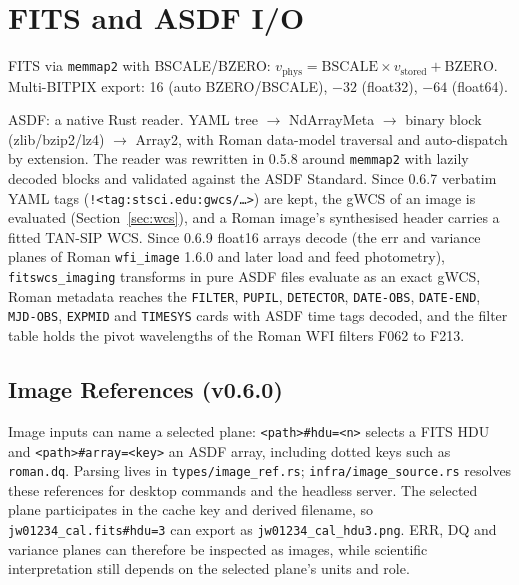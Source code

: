 \documentclass[11pt,a4paper]{article}
\newcommand{\code}[1]{\texttt{\small #1}}
\newcommand{\crate}[1]{\texttt{#1}}
\begin{document}
    \section{FITS and ASDF I/O}
    \label{sec:fitsio}

    FITS via \crate{memmap2} with BSCALE/BZERO: $v_{\text{phys}} = \text{BSCALE} \times v_{\text{stored}} + \text{BZERO}$. Multi-BITPIX export: 16 (auto BZERO/BSCALE), $-32$ (float32), $-64$ (float64).

    ASDF: a native Rust reader. YAML tree $\to$ NdArrayMeta $\to$ binary block (zlib/bzip2/lz4) $\to$ Array2, with Roman data-model traversal and auto-dispatch by extension. The reader was rewritten in 0.5.8 around \crate{memmap2} with lazily decoded blocks and validated against the ASDF Standard. Since 0.6.7 verbatim YAML tags (\code{!<tag:stsci.edu:gwcs/\ldots>}) are kept, the gWCS of an image is evaluated (Section~\ref{sec:wcs}), and a Roman image's synthesised header carries a fitted TAN-SIP WCS. Since 0.6.9 float16 arrays decode (the err and variance planes of Roman \code{wfi\_image} 1.6.0 and later load and feed photometry), \code{fitswcs\_imaging} transforms in pure ASDF files evaluate as an exact gWCS, Roman metadata reaches the \code{FILTER}, \code{PUPIL}, \code{DETECTOR}, \code{DATE-OBS}, \code{DATE-END}, \code{MJD-OBS}, \code{EXPMID} and \code{TIMESYS} cards with ASDF time tags decoded, and the filter table holds the pivot wavelengths of the Roman WFI filters F062 to F213.

    \subsection{Image References (v0.6.0)}

    Image inputs can name a selected plane: \code{<path>\#hdu=<n>} selects a FITS HDU and \code{<path>\#array=<key>} an ASDF array, including dotted keys such as \code{roman.dq}. Parsing lives in \code{types/image\_ref.rs}; \code{infra/image\_source.rs} resolves these references for desktop commands and the headless server. The selected plane participates in the cache key and derived filename, so \code{jw01234\_cal.fits\#hdu=3} can export as \code{jw01234\_cal\_hdu3.png}. ERR, DQ and variance planes can therefore be inspected as images, while scientific interpretation still depends on the selected plane's units and role.
\end{document}
